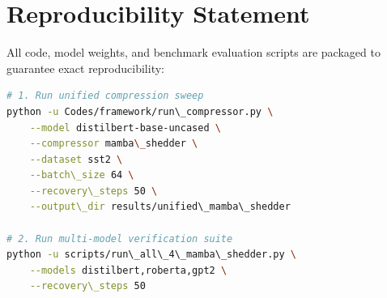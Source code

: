 \section{Reproducibility Statement}
All code, model weights, and benchmark evaluation scripts are packaged to guarantee exact reproducibility:
\begin{lstlisting}[language=bash]
# 1. Run unified compression sweep
python -u Codes/framework/run\_compressor.py \
    --model distilbert-base-uncased \
    --compressor mamba\_shedder \
    --dataset sst2 \
    --batch\_size 64 \
    --recovery\_steps 50 \
    --output\_dir results/unified\_mamba\_shedder

# 2. Run multi-model verification suite
python -u scripts/run\_all\_4\_mamba\_shedder.py \
    --models distilbert,roberta,gpt2 \
    --recovery\_steps 50
\end{lstlisting}
